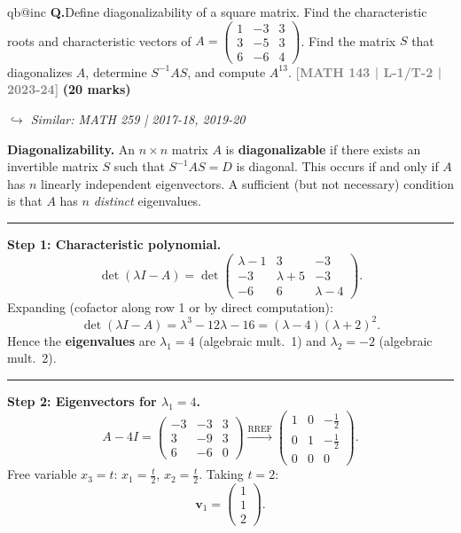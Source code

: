 \documentclass[12pt,a3paper]{article}
\makeatletter
\newcommand{\yr}[1]{\hfill\textcolor{gray}{\small\textbf{[#1]}}}
\newcommand{\mk}[1]{\textcolor{orange!70!black}{\small\textbf{(#1 marks)}}}
\newcommand{\variant}[1]{\par\vspace{1pt}\textcolor{blue!50!black}%
  {\footnotesize\textit{$\hookrightarrow$ Similar: #1}}}
\newcounter{qnum}
\newcommand{\Q}[1]{%
  \csname qb@inc\endcsname
  \needspace{4\baselineskip}
  \refstepcounter{qnum}
  \vspace{6pt}
  \noindent\textbf{Q\theqnum.}\enspace #1\par
}
\makeatother
\begin{document}
\Q{Define diagonalizability of a square matrix. Find the characteristic roots and characteristic vectors of $A = \begin{pmatrix} 1 & -3 & 3 \\ 3 & -5 & 3 \\ 6 & -6 & 4 \end{pmatrix}$. Find the matrix $S$ that diagonalizes $A$, determine $S^{-1}AS$, and compute $A^{13}$.
\yr{MATH 143 | L-1/T-2 | 2023-24} \mk{20}
\variant{MATH 259 | 2017-18, 2019-20}}

\begin{tcolorbox}[enhanced,breakable,
colback=cE!4,colframe=cE,boxrule=0.8pt,arc=5pt,
title={\textbf{Answer --- Diagonalization of $A=\begin{pmatrix}1&-3&3\\3&-5&3\\6&-6&4\end{pmatrix}$; Computing $A^{13}$}},
fonttitle=\bfseries\color{white},colbacktitle=cE]
\textbf{Diagonalizability.} An $n\times n$ matrix $A$ is \textbf{diagonalizable} if there
exists an invertible matrix $S$ such that $S^{-1}AS = D$ is diagonal.
This occurs if and only if $A$ has $n$ linearly independent eigenvectors.
A sufficient (but not necessary) condition is that $A$ has $n$ \emph{distinct}
eigenvalues.

\medskip\textcolor{cE}{\rule{\textwidth}{0.4pt}}
\textbf{Step 1: Characteristic polynomial.}
$$ \det(\lambda I - A) = \det\begin{pmatrix}\lambda-1&3&-3\\-3&\lambda+5&-3\\-6&6&\lambda-4\end{pmatrix}.$$
Expanding (cofactor along row 1 or by direct computation):
$$ \det(\lambda I - A) = \lambda^3 - 12\lambda - 16 = (\lambda - 4)(\lambda+2)^2.$$
Hence the \textbf{eigenvalues} are $\lambda_1 = 4$ (algebraic mult.\ 1) and
$\lambda_2 = -2$ (algebraic mult.\ 2).

\medskip\textcolor{cE}{\rule{\textwidth}{0.4pt}}
\textbf{Step 2: Eigenvectors for $\lambda_1 = 4$.}
$$ A - 4I = \begin{pmatrix}-3&-3&3\\3&-9&3\\6&-6&0\end{pmatrix} \xrightarrow{\text{RREF}} \begin{pmatrix}1&0&-\tfrac{1}{2}\\0&1&-\tfrac{1}{2}\\0&0&0\end{pmatrix}.$$
Free variable $x_3 = t$: $x_1 = \tfrac{t}{2}$, $x_2 = \tfrac{t}{2}$.
Taking $t=2$:
$$ \mathbf{v}_1 = \begin{pmatrix}1\\1\\2\end{pmatrix}.$$


\end{tcolorbox}
\end{document}
